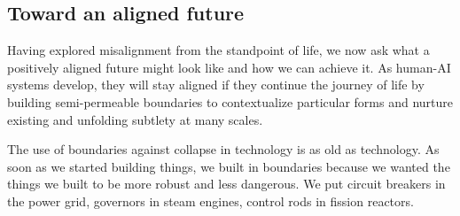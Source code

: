 \documentclass[11pt]{article}
\begin{document}






\subsection{Toward an aligned future}
\label{sec:toward}



Having explored misalignment from the standpoint of life, we now ask what a positively aligned future might look like and how we can achieve it. As human-AI systems develop, they will stay aligned if they continue the journey of life by building semi-permeable boundaries to contextualize particular forms and nurture existing and unfolding subtlety at many scales. 

The use of boundaries against collapse in technology is as old as technology. As soon as we started building things, we built in boundaries because we wanted the things we built to be more robust and less dangerous. We put circuit breakers in the power grid, governors in steam engines, control rods in fission reactors. 
\end{document}
